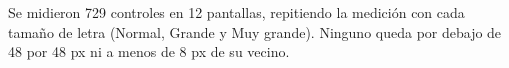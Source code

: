 Se midieron 729 controles en 12 pantallas, repitiendo la medición con cada tamaño de letra (Normal, Grande y Muy grande). Ninguno queda por debajo de 48 por 48 px ni a menos de 8 px de su vecino.